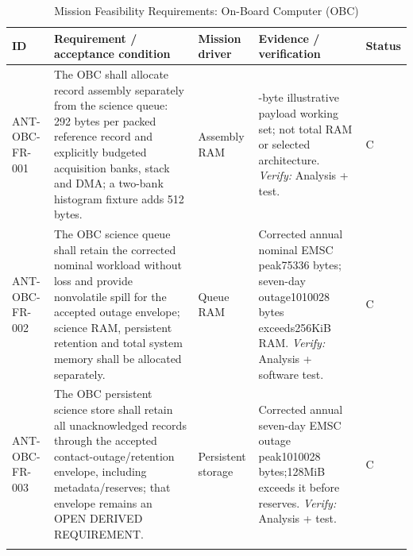 \begin{table}[H]\centering\small\setlength{\tabcolsep}{3pt}
\caption{Mission Feasibility Requirements: On-Board Computer (OBC)}\label{tab:fr-obc}
\begin{tabular}{@{}
>{\RaggedRight\arraybackslash}p{}
>{\RaggedRight\arraybackslash}p{}
>{\RaggedRight\arraybackslash}p{}
>{\RaggedRight\arraybackslash}p{}
>{\RaggedRight\arraybackslash}p{}
@{}}
\toprule ID & Requirement / acceptance condition & Mission driver & Evidence / verification & Status\\\midrule
{}\label{req:ANT-OBC-FR-001}\mbox{ANT-OBC-}\newline\mbox{FR-001} & The OBC shall allocate record assembly separately from the science queue: 292 bytes per packed reference record and explicitly budgeted acquisition banks, stack and DMA; a two-bank histogram fixture adds 512 bytes. & Assembly RAM & 804-byte illustrative payload working set; not total RAM or selected architecture. \emph{Verify:} Analysis + test. & C\\
\addlinespace[3pt]
\label{req:ANT-OBC-FR-002}\mbox{ANT-OBC-}\newline\mbox{FR-002} & The OBC science queue shall retain the corrected nominal workload without loss and provide nonvolatile spill for the accepted outage envelope; science RAM, persistent retention and total system memory shall be allocated separately. & Queue RAM & Corrected annual nominal EMSC peak75336 bytes; seven-day outage1010028 bytes exceeds256KiB RAM. \emph{Verify:} Analysis + software test. & C\\
\addlinespace[3pt]
\label{req:ANT-OBC-FR-003}\mbox{ANT-OBC-}\newline\mbox{FR-003} & The OBC persistent science store shall retain all unacknowledged records through the accepted contact-outage/retention envelope, including metadata/reserves; that envelope remains an OPEN DERIVED REQUIREMENT. & Persistent storage & Corrected annual seven-day EMSC outage peak1010028 bytes;128MiB exceeds it before reserves. \emph{Verify:} Analysis + test. & C\\
\addlinespace[3pt]
\bottomrule
\end{tabular}
\end{table}
